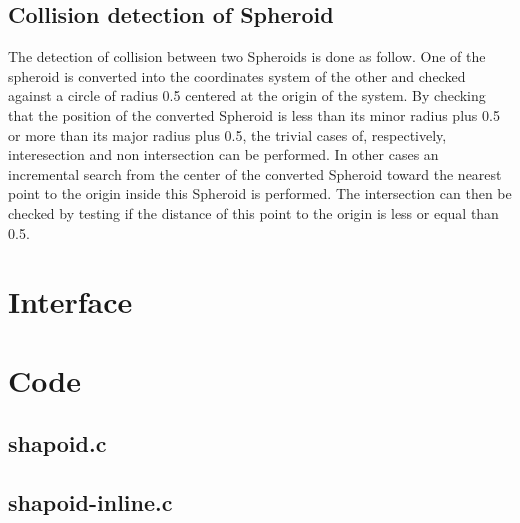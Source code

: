 \subsection{Collision detection of Spheroid}

The detection of collision between two Spheroids is done as follow. One of the spheroid is converted into the coordinates system of the other and checked against a circle of radius 0.5 centered at the origin of the system. By checking that the position of the converted Spheroid is less than its minor radius plus 0.5 or more than its major radius plus 0.5, the trivial cases of, respectively, interesection and non intersection can be performed. In other cases an incremental search from the center of the converted Spheroid toward the nearest point to the origin inside this Spheroid is performed. The intersection can then be checked by testing if the distance of this point to the origin is less or equal than 0.5.\\

\section{Interface}

\begin{scriptsize}
\begin{ttfamily}

\end{ttfamily}
\end{scriptsize}

\section{Code}

\subsection{shapoid.c}

\begin{scriptsize}
\begin{ttfamily}

\end{ttfamily}
\end{scriptsize}

\subsection{shapoid-inline.c}

\begin{scriptsize}
\begin{ttfamily}

\end{ttfamily}
\end{scriptsize}

